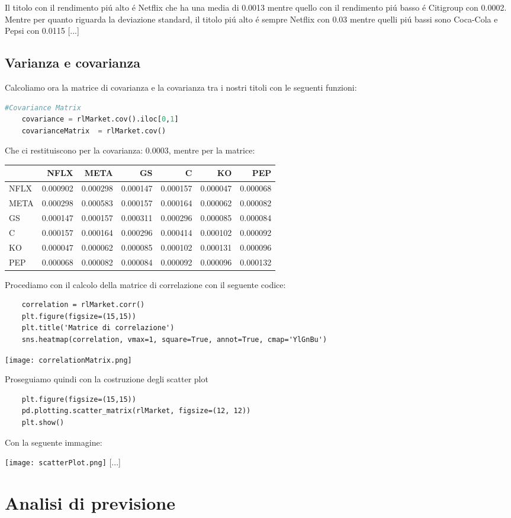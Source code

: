 \documentclass{report}
\begin{document}
\noindent Il titolo con il rendimento piú alto é Netflix che ha una media di \num{0.0013} mentre quello con il rendimento piú basso é Citigroup con \num{0.0002}.
Mentre per quanto riguarda la deviazione standard, il titolo piú alto é sempre Netflix con \num{0.03} mentre quelli piú bassi sono Coca-Cola e Pepsi con \num{0.0115} [...]
\section{Varianza e covarianza}
Calcoliamo ora la matrice di covarianza e la covarianza tra i nostri titoli con le seguenti funzioni:
\begin{lstlisting}[language=python]
    #Covariance Matrix
    covariance = rlMarket.cov().iloc[0,1]
    covarianceMatrix  = rlMarket.cov()
\end{lstlisting}
Che ci restituiscono per la covarianza: \num{0.0003}, mentre per la matrice:

\begin{tabular}{lrrrrrr}
\toprule
{} &      NFLX &      META &        GS &         C &        KO &       PEP \\
\midrule
NFLX &  0.000902 &  0.000298 &  0.000147 &  0.000157 &  0.000047 &  0.000068 \\
META &  0.000298 &  0.000583 &  0.000157 &  0.000164 &  0.000062 &  0.000082 \\
GS   &  0.000147 &  0.000157 &  0.000311 &  0.000296 &  0.000085 &  0.000084 \\
C    &  0.000157 &  0.000164 &  0.000296 &  0.000414 &  0.000102 &  0.000092 \\
KO   &  0.000047 &  0.000062 &  0.000085 &  0.000102 &  0.000131 &  0.000096 \\
PEP  &  0.000068 &  0.000082 &  0.000084 &  0.000092 &  0.000096 &  0.000132 \\
\bottomrule
\end{tabular}

Procediamo con il calcolo della matrice di correlazione con il seguente codice:
\begin{lstlisting}
    correlation = rlMarket.corr()
    plt.figure(figsize=(15,15))
    plt.title('Matrice di correlazione')
    sns.heatmap(correlation, vmax=1, square=True, annot=True, cmap='YlGnBu')
\end{lstlisting}

\texttt{[image: correlationMatrix.png]}

Proseguiamo quindi con la costruzione degli scatter plot
\begin{lstlisting}
    plt.figure(figsize=(15,15))
    pd.plotting.scatter_matrix(rlMarket, figsize=(12, 12))
    plt.show()
\end{lstlisting}
Con la seguente immagine:

\texttt{[image: scatterPlot.png]}
[...]
\chapter{Analisi di previsione}
\tableofcontents
\end{document}
